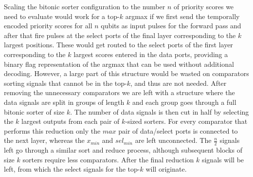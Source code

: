 \documentclass[conference]{IEEEtran}
\begin{document}
Scaling the bitonic sorter configuration to the number $n$ of priority scores we need to evaluate would work for a top-$k$ argmax if we first send the temporally encoded priority scores for all $n$ qubits as input pulses for the forward pass and after that fire pulses at the select ports of the final layer corresponding to the $k$ largest positions.
These would get routed to the select ports of the first layer corresponding to the $k$ largest scores entered in the data ports, providing a binary flag representation of the argmax that can be used without additional decoding.
However, a large part of this structure would be wasted on comparators sorting signals that cannot be in the top-$k$, and thus are not needed.
After removing the unnecessary comparators we are left with a structure where the data signals are split in groups of length $k$ and each group goes through a full bitonic sorter of size $k$.
The number of data signals is then cut in half by selecting the $k$ largest outputs from each pair of $k$-sized sorters.
For every comparator that performs this reduction only the $max$ pair of data/select ports is connected to the next layer, whereas the $x_{min}$ and $sel_{min}$ are left unconnected.
The $\frac{n}{2}$ signals left go through a similar sort and reduce process, although subsequent blocks of size $k$ sorters require less comparators. 
After the final reduction $k$ signals will be left, from which the select signals for the top-$k$ will originate.
\end{document}
